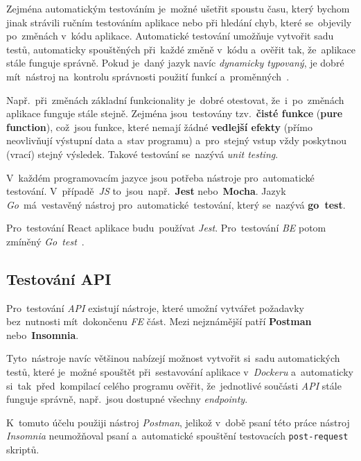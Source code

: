 \documentclass[11pt,a4paper]{report}
\let\oldacrshort\acrshort
\renewcommand{\acrshort}[1]{\emph{\normalsize\color[rgb]{0,0,0}\noindent\oldacrshort{#1}}}
\begin{document}
            Zejména automatickým testováním je~možné ušetřit spoustu času, který bychom jinak strávili ručním testováním aplikace nebo při hledání chyb, které se~objevily po~změnách v~kódu aplikace. Automatické testování umožňuje vytvořit sadu testů, automaticky spouštěných při~každé změně v~kódu a~ověřit tak, že~aplikace stále funguje správně. Pokud je~daný jazyk navíc \emph{dynamicky typovaný}, je dobré mít~nástroj na~kontrolu správnosti použití funkcí a~proměnných~\cite{compilers, itnetworkBestPractices}.
            
            Např.~při~změnách základní funkcionality je~dobré otestovat, že~i~po~změnách aplikace funguje stále stejně. Zejména jsou~testovány tzv.~\textbf{čisté funkce} (\textbf{pure function}), což~jsou funkce, které nemají žádné \textbf{vedlejší efekty} (přímo neovlivňují výstupní data a~stav programu) a~pro~stejný vstup vždy poskytnou (vrací) stejný výsledek. Takové testování se~nazývá \emph{unit testing}.
            
            V~každém programovacím jazyce jsou potřeba nástroje pro~automatické testování. V~případě~\acrshort{JS} to~jsou~např.~\textbf{Jest} nebo~\textbf{Mocha}. Jazyk \emph{Go}~má~vestavěný nástroj pro~automatické~testování, který se~nazývá \textbf{go~test}.
            
            Pro~testování React aplikace budu~používat \emph{Jest}. Pro~testování \acrshort{BE} potom zmíněný \emph{Go~test}~\cite{jestjsTestingReact}.
            
            \subsection{Testování API}
                Pro~testování \acrshort{API} existují nástroje, které umožní vytvářet požadavky bez~nutnosti mít~dokončenu \acrshort{FE} část. Mezi nejznámější patří \textbf{Postman} nebo~\textbf{Insomnia}.
                
                Tyto~nástroje navíc většinou nabízejí možnost vytvořit si~sadu automatických testů, které je~možné spouštět při~sestavování aplikace v~\emph{Dockeru} a~automaticky si~tak~před~kompilací celého programu ověřit, že~jednotlivé součásti \acrshort{API} stále funguje správně, např.~jsou dostupné všechny \emph{endpointy}.

                K~tomuto účelu použiji nástroj \emph{Postman}, jelikož v~době psaní této práce nástroj \emph{Insomnia} neumožňoval psaní a~automatické spouštění testovacích \texttt{post-request} skriptů.
                
\end{document}
